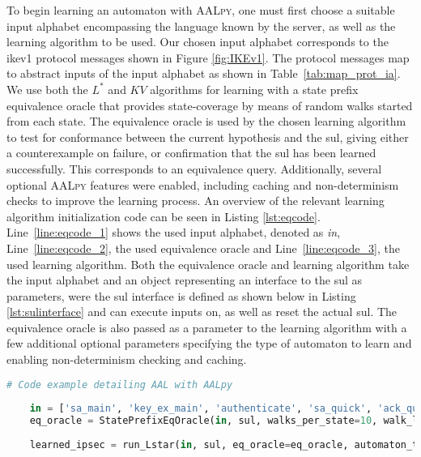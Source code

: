 To begin learning an automaton with \textsc{AALpy}, one must first choose a suitable input alphabet encompassing the language known by the server, as well as the learning algorithm to be used. Our chosen input alphabet corresponds to the \ac{ike}v1 protocol messages shown in Figure \ref{fig:IKEv1}. The protocol messages map to abstract inputs of the input alphabet as shown in Table~\ref{tab:map_prot_ia}. We use both the $L^*$ and $KV$ algorithms for learning with a state prefix equivalence oracle that provides state-coverage by means of random walks started from each state. The equivalence oracle is used by the chosen learning algorithm to test for conformance between the current hypothesis and the \ac{sul}, giving either a counterexample on failure, or confirmation that the \ac{sul} has been learned successfully. This corresponds to an equivalence query. Additionally, several optional \textsc{AALpy} features were enabled, including caching and non-determinism checks to improve the learning process. An overview of the relevant learning algorithm initialization code can be seen in Listing \ref{lst:eqcode}. Line~\ref{line:eqcode_1} shows the used input alphabet, denoted as \emph{in}, Line~\ref{line:eqcode_2}, the used equivalence oracle and Line~\ref{line:eqcode_3}, the used learning algorithm. Both the equivalence oracle and learning algorithm take the input alphabet and an object representing an interface to the \ac{sul} as parameters, were the \ac{sul} interface is defined as shown below in Listing \ref{lst:sulinterface} and can execute inputs on, as well as reset the actual \ac{sul}. The equivalence oracle is also passed as a parameter to the learning algorithm with a few additional optional parameters specifying the type of automaton to learn and enabling non-determinism checking and caching. \\

\begin{lstlisting}[float=h, caption=Model-learning framework initialisation code excerpt., label=lst:eqcode, language=python, escapechar=§]
	# Code example detailing AAL with AALpy
	
	in = ['sa_main', 'key_ex_main', 'authenticate', 'sa_quick', 'ack_quick'] §\label{line:eqcode_1}§
	eq_oracle = StatePrefixEqOracle(in, sul, walks_per_state=10, walk_len=10) §\label{line:eqcode_2}§
	
	learned_ipsec = run_Lstar(in, sul, eq_oracle=eq_oracle, automaton_type='mealy', cache_and_non_det_check=True) §\label{line:eqcode_3}§
	
\end{lstlisting}

